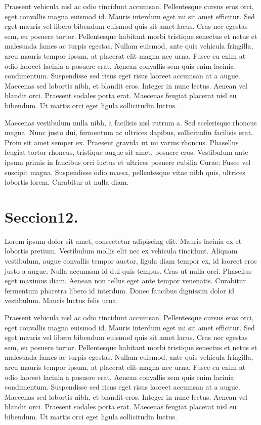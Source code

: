 Praesent vehicula nisl ac odio tincidunt accumsan. Pellentesque cursus eros orci, eget convallis magna euismod id. Mauris interdum eget mi sit amet efficitur. Sed eget mauris vel libero bibendum euismod quis sit amet lacus. Cras nec egestas sem, eu posuere tortor. Pellentesque habitant morbi tristique senectus et netus et malesuada fames ac turpis egestas. Nullam euismod, ante quis vehicula fringilla, arcu mauris tempor ipsum, at placerat elit magna nec urna. Fusce eu enim at odio laoreet lacinia a posuere erat. Aenean convallis sem quis enim lacinia condimentum. Suspendisse sed risus eget risus laoreet accumsan at a augue. Maecenas sed lobortis nibh, et blandit eros. Integer in nunc lectus. Aenean vel blandit orci. Praesent sodales porta erat. Maecenas feugiat placerat nisl eu bibendum. Ut mattis orci eget ligula sollicitudin luctus.

Maecenas vestibulum nulla nibh, a facilisis nisl rutrum a. Sed scelerisque rhoncus magna. Nunc justo dui, fermentum ac ultrices dapibus, sollicitudin facilisis erat. Proin sit amet semper ex. Praesent gravida ut mi varius rhoncus. Phasellus feugiat tortor rhoncus, tristique augue sit amet, posuere eros. Vestibulum ante ipsum primis in faucibus orci luctus et ultrices posuere cubilia Curae; Fusce vel suscipit magna. Suspendisse odio massa, pellentesque vitae nibh quis, ultrices lobortis lorem. Curabitur at nulla diam. 


\section{Seccion12.}

Lorem ipsum dolor sit amet, consectetur adipiscing elit. Mauris lacinia ex et lobortis pretium. Vestibulum mollis elit nec ex vehicula tincidunt. Aliquam vestibulum, augue convallis tempor auctor, ligula diam tempor ex, id laoreet eros justo a augue. Nulla accumsan id dui quis tempus. Cras ut nulla orci. Phasellus eget maximus diam. Aenean non tellus eget ante tempor venenatis. Curabitur fermentum pharetra libero id interdum. Donec faucibus dignissim dolor id vestibulum. Mauris luctus felis urna.

Praesent vehicula nisl ac odio tincidunt accumsan. Pellentesque cursus eros orci, eget convallis magna euismod id. Mauris interdum eget mi sit amet efficitur. Sed eget mauris vel libero bibendum euismod quis sit amet lacus. Cras nec egestas sem, eu posuere tortor. Pellentesque habitant morbi tristique senectus et netus et malesuada fames ac turpis egestas. Nullam euismod, ante quis vehicula fringilla, arcu mauris tempor ipsum, at placerat elit magna nec urna. Fusce eu enim at odio laoreet lacinia a posuere erat. Aenean convallis sem quis enim lacinia condimentum. Suspendisse sed risus eget risus laoreet accumsan at a augue. Maecenas sed lobortis nibh, et blandit eros. Integer in nunc lectus. Aenean vel blandit orci. Praesent sodales porta erat. Maecenas feugiat placerat nisl eu bibendum. Ut mattis orci eget ligula sollicitudin luctus.

